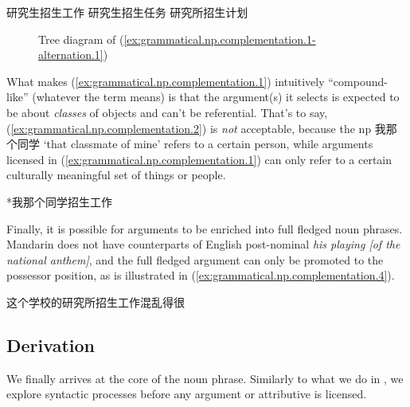 \documentclass[UTF8, a4paper, oneside, scheme=plain, 12pt]{ctexrep}
\newcommand{\form}[1]{\emph{#1}}
\newcommand{\translate}[1]{`#1'}
\begin{document}
\begin{exe}
    \ex\label{ex:grammatical.np.complementation.3} \begin{xlist}
        \ex\label{ex:grammatical.np.complementation.3.1} 研究生招生工作
        \ex 研究生招生任务
        \ex 研究所招生计划
    \end{xlist}
\end{exe}

\begin{figure}[H]
    \centering
    {
        \small
        
    }
    \caption{Tree diagram of (\ref{ex:grammatical.np.complementation.1-alternation.1})}
    \label{fig:grammatical.np.complementation.1-alternation.1}
\end{figure}

What makes (\ref{ex:grammatical.np.complementation.1}) intuitively ``compound-like'' (whatever the term means) is that
the argument(s) it selects is expected to be about \emph{classes} of objects and can't be referential.
That's to say, (\ref{ex:grammatical.np.complementation.2})
is \emph{not} acceptable, because the \ac{np} 我那个同学 \translate{that classmate of mine}
refers to a certain person, while arguments licensed in (\ref{ex:grammatical.np.complementation.1})
can only refer to a certain culturally meaningful set of things or people.

\begin{exe}
    \ex\label{ex:grammatical.np.complementation.2} *我那个同学招生工作
\end{exe}

Finally, it is possible for arguments to be enriched into full fledged noun phrases.
Mandarin does not have counterparts of English post-nominal \form{his playing [of the national anthem]},
and the full fledged argument can only be promoted to the possessor position,
as is illustrated in (\ref{ex:grammatical.np.complementation.4}).

\begin{exe}
    \ex\label{ex:grammatical.np.complementation.4} 这个学校的研究所招生工作混乱得很
\end{exe}

\subsection{Derivation}\label{sec:grammatical.np.derivation}

We finally arrives at the core of the noun phrase.
Similarly to what we do in ,
we explore syntactic processes before any argument or attributive is licensed.
\end{document}
